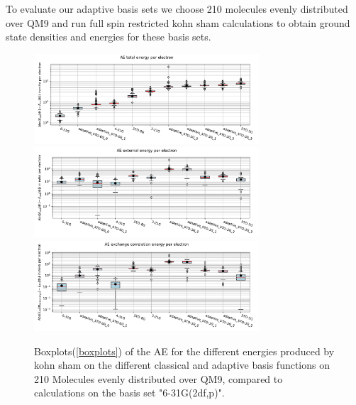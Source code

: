 To evaluate our adaptive basis sets we choose 210 molecules evenly distributed over QM9 and run full spin restricted kohn sham calculations to obtain ground state densities and energies for these basis sets.

\begin{figure}
    \centering
    \includegraphics[width=0.75\textwidth]{chapters/results/results_images/adaptive_basis_functions/total_energy_adaptive_basis_sets}
    \includegraphics[width=0.75\textwidth]{chapters/results/results_images/adaptive_basis_functions/coulomb_energy_adaptive_basis_sets}
    \includegraphics[width=0.75\textwidth]{chapters/results/results_images/adaptive_basis_functions/exchange_correlation_energy_adaptive_basis_sets}
    \caption{Boxplots(\ref{boxplots}) of the AE for the different energies produced by kohn sham on the different classical and adaptive basis functions on 210 Molecules evenly distributed over QM9, compared to calculations on the basis set "6-31G(2df,p)".} \label{fig:AE_energies_adaptive_basis_sets}
\end{figure}




